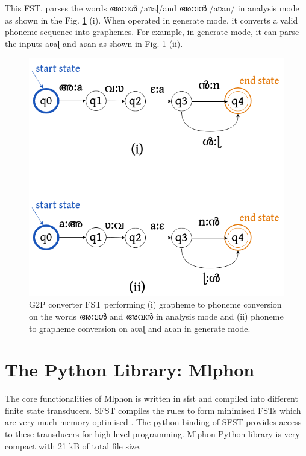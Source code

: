 This FST, parses the words {\mal അവൾ}  {\ipa /aʋaɭ/}and {\mal അവൻ}  {\ipa /aʋan}/ in analysis mode as shown
in the Fig. \ref{g2pfst} (i). When operated in generate mode, it converts a
valid phoneme sequence into graphemes. For example, in generate mode, it can
parse the inputs {\ipa aʋaɭ} and {\ipa aʋan} as shown in Fig. \ref{g2pfst}
(ii).

\begin{figure}[htpb]
	\centering
	\includegraphics[width=0.6\linewidth]{g2p-fst-drawio.png}
	\caption{G2P converter FST performing (i) grapheme to phoneme conversion on the words  {\mal അവൾ} and {\mal അവൻ} in analysis mode and (ii) phoneme to grapheme conversion on {\ipa aʋaɭ} and {\ipa aʋan} in generate mode. }
	\label{g2pfst}
\end{figure}


\section{The Python Library: Mlphon}
\label{pypi}
The core functionalities of Mlphon is written in \gls{sfst} and compiled into different finite state transducers. SFST compiles the rules to form minimised FSTs which are very much memory optimised \cite{mohri-1997-finite}. The python binding of SFST provides access to these transducers for high level programming. Mlphon Python library is very compact with 21 kB of total file size.

